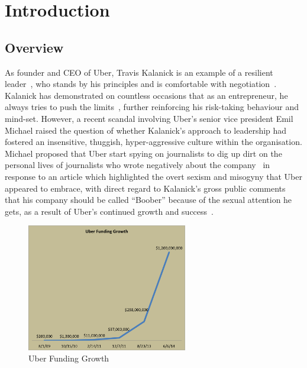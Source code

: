 \chapter{Introduction}\label{chap:introduction}

  \section{Overview}\label{sec:overview}

    As founder and CEO of Uber, Travis Kalanick is an example of a resilient leader~\parencite{aib2015}, who stands by his principles and is comfortable with negotiation~\parencite{bhattacharya2015}. Kalanick has demonstrated on countless occasions that as an entrepreneur, he always tries to push the limits~\parencite{smith2014}, further reinforcing his risk-taking behaviour and mind-set. However, a recent scandal involving Uber's senior vice president Emil Michael raised the question of whether Kalanick's approach to leadership had fostered an insensitive, thuggish, hyper-aggressive culture within the organisation. Michael proposed that Uber start spying on journalists to dig up dirt on the personal lives of journalists who wrote negatively about the company~\parencite{withnall2014} in response to an article which highlighted the overt sexism and misogyny that Uber appeared to embrace, with direct regard to Kalanick's gross public comments that his company should be called ``Boober'' because of the sexual attention he gets, as a result of Uber's continued growth and success~\parencite{lacy2014}. 

    \begin{figure}
      \centering
      \begin{minipage}{7cm}
        \centering
        \includegraphics[width=7cm]{inc/uber_funding_growth.png}
        \caption[Uber Funding Growth]{Uber Funding Growth~\parencite{ferenstein2014}}
        \label{fig:uber_funding_growth}
      \end{minipage}
    \end{figure}

